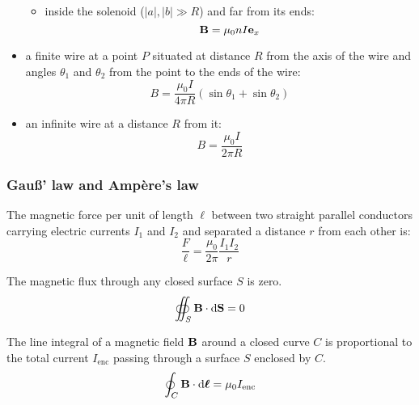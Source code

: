 \documentclass[../../../main.tex]{subfiles}
\begin{document}
\begin{multicols}{2}
\begin{prop}
\begin{itemize}
\begin{itemize}
\begin{center}
\begin{minipage}{\linewidth}
                        \centering
                        
                      \end{minipage}
                    \end{center}
              \item inside the solenoid ($|a|,|b|\gg R$) and far from its ends: $$\vb{B}=\mu_0 nI\vb{e}_x$$
            \end{itemize}
      \item a finite wire at a point $P$ situated at distance $R$ from the axis of the wire and angles $\theta_1$ and $\theta_2$ from the point to the ends of the wire: $$B=\frac{\mu_0I}{4\pi R}(\sin\theta_1+\sin\theta_2)$$
            \begin{center}
              \begin{minipage}{\linewidth}
                \centering
                
              \end{minipage}
            \end{center}
      \item an infinite wire at a distance $R$ from it: $$B=\frac{\mu_0I}{2\pi R}$$
    \end{itemize}
  \end{prop}
  \subsubsection*{Gau\ss' law and Ampère's law}
  \begin{prop}
    The magnetic force per unit of length $\ell$ between two straight parallel conductors carrying electric currents $I_1$ and $I_2$ and separated a distance $r$ from each other is: $$\frac{F}{\ell}=\frac{\mu_0}{2\pi}\frac{I_1I_2}{r}$$
  \end{prop}
  \begin{law}
    The magnetic flux through any closed surface $S$ is zero.
    $$\oiint_S\vb{B}\cdot\dd\vb{S}=0$$
  \end{law}
  \begin{law}
    The line integral of a magnetic field $\vb{B}$ around a closed curve $C$ is proportional to the total current $I_\text{enc}$ passing through a surface $S$ enclosed by $C$.
    $$\oint_C\vb{B}\cdot\dd\vb*{\ell}=\mu_0I_\text{enc}$$
  \end{law}

\end{multicols}
\end{document}
